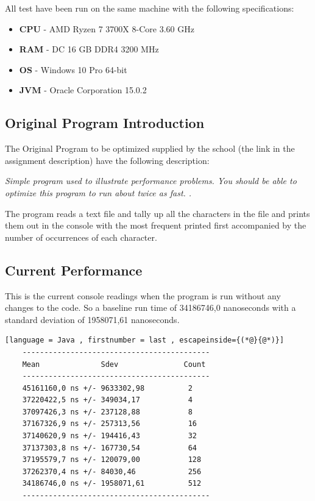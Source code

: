 
All test have been run on the same machine with the following specifications: 


\begin{itemize}
    \item \textbf{CPU} - AMD Ryzen 7 3700X 8-Core 3.60 GHz
    \item \textbf{RAM} - DC 16 GB DDR4 3200 MHz 
    \item \textbf{OS} - Windows 10 Pro 64-bit
    \item \textbf{JVM} - Oracle Corporation 15.0.2
\end{itemize}
\vspace{0.5cm}
\subsection{Original Program Introduction}



\label{sec:2.1}
The Original Program to be optimized supplied by the school (the link in the assignment description) have the following description:
\begin{displayquote}
\emph{Simple program used to illustrate performance problems. You should be able to optimize this program to run about twice as fast. \cite{cph}.} 
\end{displayquote}

The program reads a text file and tally up all the characters in the file and prints them out in the console with the most frequent printed first accompanied by the number of occurrences of each character. 

\vspace{0.5cm}
\subsection{Current Performance}
\label{sec:2.2}
This is the current console readings when the program is run without any changes to the code. So a baseline run time of 34186746,0 nanoseconds with a standard deviation of 1958071,61 nanoseconds. 
\begin{lstlisting}[language = Java , firstnumber = last , escapeinside={(*@}{@*)}]
    -------------------------------------------
    Mean              Sdev               Count
    -------------------------------------------
    45161160,0 ns +/- 9633302,98          2
    37220422,5 ns +/- 349034,17           4
    37097426,3 ns +/- 237128,88           8
    37167326,9 ns +/- 257313,56           16
    37140620,9 ns +/- 194416,43           32
    37137303,8 ns +/- 167730,54           64
    37195579,7 ns +/- 120079,00           128
    37262370,4 ns +/- 84030,46            256
    34186746,0 ns +/- 1958071,61          512
    -------------------------------------------
\end{lstlisting}

